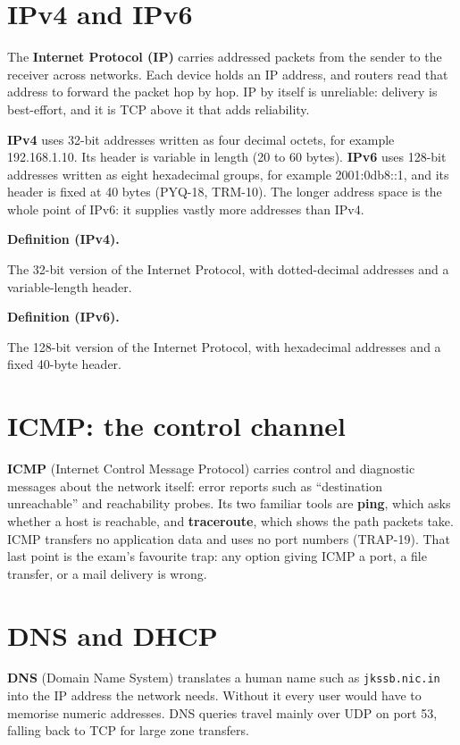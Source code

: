 \documentclass[11pt]{article}
\newenvironment{definitionbox}[1]{%
  \par\noindent\textbf{Definition (#1).}\ \itshape
}{\par\vspace{0.3em}}
\begin{document}
\section{IPv4 and IPv6}
The \textbf{Internet Protocol (IP)} carries addressed packets from the sender
to the receiver across networks. Each device holds an IP address, and routers
read that address to forward the packet hop by hop. IP by itself is
unreliable: delivery is best-effort, and it is TCP above it that adds
reliability.

\textbf{IPv4} uses 32-bit addresses written as four decimal octets, for
example 192.168.1.10. Its header is variable in length (20 to 60 bytes).
\textbf{IPv6} uses 128-bit addresses written as eight hexadecimal groups, for
example 2001:0db8::1, and its header is fixed at 40 bytes (PYQ-18, TRM-10).
The longer address space is the whole point of IPv6: it supplies vastly more
addresses than IPv4.

\begin{definitionbox}{IPv4}
The 32-bit version of the Internet Protocol, with dotted-decimal addresses
and a variable-length header.
\end{definitionbox}

\begin{definitionbox}{IPv6}
The 128-bit version of the Internet Protocol, with hexadecimal addresses and
a fixed 40-byte header.
\end{definitionbox}

\section{ICMP: the control channel}
\textbf{ICMP} (Internet Control Message Protocol) carries control and
diagnostic messages about the network itself: error reports such as
``destination unreachable'' and reachability probes. Its two familiar tools
are \textbf{ping}, which asks whether a host is reachable, and
\textbf{traceroute}, which shows the path packets take. ICMP transfers no
application data and uses no port numbers (TRAP-19). That last point is the
exam's favourite trap: any option giving ICMP a port, a file transfer, or a
mail delivery is wrong.

\section{DNS and DHCP}
\textbf{DNS} (Domain Name System) translates a human name such as
\texttt{jkssb.nic.in} into the IP address the network needs. Without it every
user would have to memorise numeric addresses. DNS queries travel mainly over
UDP on port 53, falling back to TCP for large zone transfers.
\end{document}
